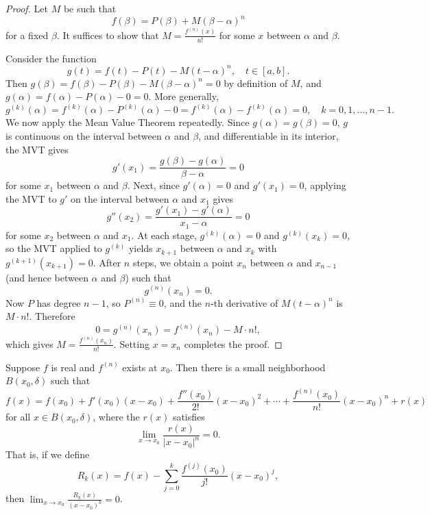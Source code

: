 \documentclass[../master/master.tex]{subfiles}
\begin{document}
\begin{proof}
Let $M$ be such that
\[
f(\beta) = P(\beta) + M(\beta - \alpha)^n
\]
for a fixed $\beta$. It suffices to show that $M = \frac{f^{(n)}(x)}{n!}$ for some $x$ between $\alpha$ and $\beta$.

Consider the function
\[
g(t) = f(t) - P(t) - M(t - \alpha)^n, \quad t \in [a,b].
\]
Then $g(\beta) = f(\beta) - P(\beta) - M(\beta - \alpha)^n = 0$ by definition of $M$, and $g(\alpha) = f(\alpha) - P(\alpha) - 0 = 0$. More generally,
\[
g^{(k)}(\alpha) = f^{(k)}(\alpha) - P^{(k)}(\alpha) - 0 = f^{(k)}(\alpha) - f^{(k)}(\alpha) = 0, \quad k = 0, 1, \dots, n-1.
\]
We now apply the Mean Value Theorem repeatedly. Since $g(\alpha) = g(\beta) = 0$, $g$ is continuous on the interval between $\alpha$ and $\beta$, and differentiable in its interior, the MVT gives
\[
g'(x_1) = \frac{g(\beta) - g(\alpha)}{\beta - \alpha} = 0
\]
for some $x_1$ between $\alpha$ and $\beta$. Next, since $g'(\alpha) = 0$ and $g'(x_1) = 0$, applying the MVT to $g'$ on the interval between $\alpha$ and $x_1$ gives
\[
g''(x_2) = \frac{g'(x_1) - g'(\alpha)}{x_1 - \alpha} = 0
\]
for some $x_2$ between $\alpha$ and $x_1$. At each stage, $g^{(k)}(\alpha) = 0$ and $g^{(k)}(x_k) = 0$, so the MVT applied to $g^{(k)}$ yields $x_{k+1}$ between $\alpha$ and $x_k$ with $g^{(k+1)}(x_{k+1}) = 0$. After $n$ steps, we obtain a point $x_n$ between $\alpha$ and $x_{n-1}$ (and hence between $\alpha$ and $\beta$) such that
\[
g^{(n)}(x_n) = 0.
\]
Now $P$ has degree $n-1$, so $P^{(n)} \equiv 0$, and the $n$-th derivative of $M(t - \alpha)^n$ is $M \cdot n!$. Therefore
\[
0 = g^{(n)}(x_n) = f^{(n)}(x_n) - M \cdot n!,
\]
which gives $M = \frac{f^{(n)}(x_n)}{n!}$. Setting $x = x_n$ completes the proof.
\end{proof}

\begin{theorem}
Suppose $f$ is real and $f^{(n)}$ exists at $x_0$. Then there is a small neighborhood $B(x_0, \delta)$ such that
\[
f(x) = f(x_0) + f'(x_0)(x - x_0) + \frac{f''(x_0)}{2!}(x - x_0)^2 + \cdots + \frac{f^{(n)}(x_0)}{n!}(x - x_0)^n + r(x)
\]
for all $x \in B(x_0, \delta)$, where the  $r(x)$ satisfies
\[
\lim_{x \to x_0} \frac{r(x)}{|x - x_0|^n} = 0.
\]
That is, if we define
\[
R_k(x) = f(x) - \sum_{j=0}^{k} \frac{f^{(j)}(x_0)}{j!}(x - x_0)^j,
\]
then $\displaystyle\lim_{x \to x_0} \frac{R_k(x)}{(x - x_0)^k} = 0$.
\end{theorem}
\end{document}
